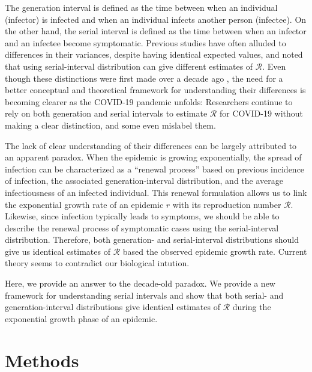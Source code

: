 \documentclass[12pt]{article}
\begin{document}
The generation interval is defined as the time between when an individual (infector) is infected and when an individual infects another person (infectee).
On the other hand, the serial interval is defined as the time between when an infector and an infectee become symptomatic.
Previous studies have often alluded to differences in their variances, despite having identical expected values, and noted that using serial-interval distribution can give different estimates of $\mathcal R$.
Even though these distinctions were first made over a decade ago \citep{svensson2007note}, 
the need for a better conceptual and theoretical framework for understanding their differences is becoming clearer as the COVID-19 pandemic unfolds:
Researchers continue to rely on both generation and serial intervals to estimate $\mathcal R$ for COVID-19 without making a clear distinction, and some even mislabel them.

The lack of clear understanding of their differences can be largely attributed to an apparent paradox.
When the epidemic is growing exponentially, the spread of infection can be characterized as a ``renewal process'' based on previous incidence of infection, the associated generation-interval distribution, and the average infectiousness of an infected individual.
This renewal formulation allows us to link the exponential growth rate of an epidemic $r$ with its reproduction number $\mathcal R$.
Likewise, since infection typically leads to symptoms, we should be able to describe the renewal process of symptomatic cases using the serial-interval distribution.
Therefore, both generation- and serial-interval distributions should give us identical estimates of  $\mathcal R$ based the observed epidemic growth rate.
Current theory seems to contradict our biological intution.

Here, we provide an answer to the decade-old paradox.
We provide a new framework for understanding serial intervals and show that both serial- and generation-interval distributions give identical estimates of $\mathcal R$ during the exponential growth phase of an epidemic.

\section{Methods}
\end{document}

